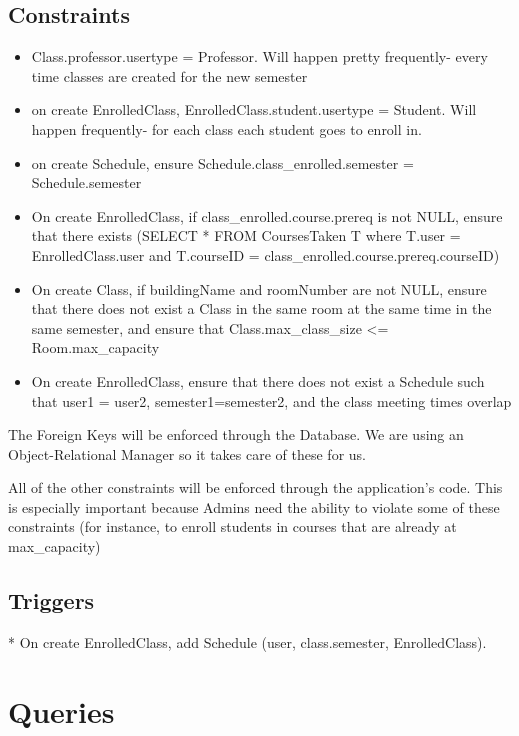 \documentclass[11pt,oneside,a4paper]{article}
\begin{document}
\subsection{Constraints}
\begin{itemize}
	\item Class.professor.usertype = Professor. Will happen pretty
	frequently- every time classes are created for the new semester\\
	\item on create EnrolledClass, EnrolledClass.student.usertype = Student. Will
	happen frequently- for each class each student goes to enroll in.\\
	\item on create Schedule, ensure Schedule.class\_enrolled.semester =
	Schedule.semester\\
	\item On create EnrolledClass, if class\_enrolled.course.prereq is not NULL, ensure
	that there exists (SELECT * FROM CoursesTaken T where T.user =
	EnrolledClass.user and T.courseID =
	class\_enrolled.course.prereq.courseID)\\
	\item On create Class, if buildingName and roomNumber are not NULL, ensure that
	there does not exist a Class in the same room at the same time in the same
	semester, and ensure that Class.max\_class\_size <= Room.max\_capacity \\
	\item On create EnrolledClass, ensure that there does not exist a Schedule such
	that user1 = user2, semester1=semester2, and the class meeting times
	overlap

\end{itemize}

The Foreign Keys will be enforced through the Database. We are using an
Object-Relational Manager so it takes care of these for us.

All of the other constraints will be enforced through the application's code. This is especially important because
Admins need the ability to violate some of these constraints (for instance, to
enroll students in courses that are already at max\_capacity)
\subsection{Triggers}
	* On create EnrolledClass,  add Schedule (user, class.semester,
	EnrolledClass). 

\section{Queries}
\end{document}
